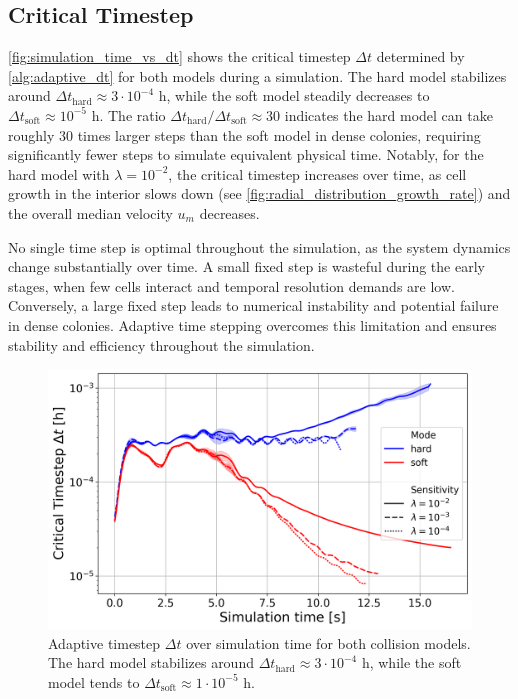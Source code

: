 \documentclass[conference]{IEEEtran}
\begin{document}
\subsection{Critical Timestep}
\autoref{fig:simulation_time_vs_dt} shows the critical timestep $\Delta t$ determined by \autoref{alg:adaptive_dt} for both models during a simulation. The hard model stabilizes around $\Delta t_{\text{hard}} \approx 3 \cdot 10^{-4}$ h, while the soft model steadily decreases to $\Delta t_{\text{soft}} \approx 10^{-5}$ h. The ratio $\Delta t_{\text{hard}}/\Delta t_{\text{soft}} \approx 30$ indicates the hard model can take roughly 30 times larger steps than the soft model in dense colonies, requiring significantly fewer steps to simulate equivalent physical time. Notably, for the hard model with $\lambda = 10^{-2}$, the critical timestep increases over time, as cell growth in the interior slows down (see \autoref{fig:radial_distribution_growth_rate}) and the overall median velocity $u_m$ decreases.

No single time step is optimal throughout the simulation, as the system dynamics change substantially over time. A small fixed step is wasteful during the early stages, when few cells interact and temporal resolution demands are low. Conversely, a large fixed step leads to numerical instability and potential failure in dense colonies. Adaptive time stepping overcomes this limitation and ensures stability and efficiency throughout the simulation.

\begin{figure}[H]
    \centering
    \includegraphics[width=\linewidth]{figures/comparison_plots/combined_simulation_time [s]_vs_dt.png}
    \caption{Adaptive timestep $\Delta t$ over simulation time for both collision models. The hard model stabilizes around $\Delta t_{\text{hard}} \approx 3 \cdot 10^{-4}$ h, while the soft model tends to $\Delta t_{\text{soft}} \approx 1 \cdot 10^{-5}$ h.}
    \label{fig:simulation_time_vs_dt}
\end{figure}
\end{document}
